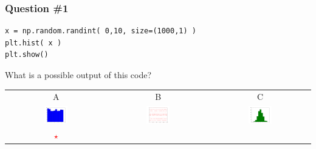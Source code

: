\documentclass[11pt]{beamer}
\newcommand{\correctstar}{\textcolor{red}{$\star$}}
\begin{document}
\begin{frame}[fragile]
  \frametitle{Question \#1}
  \Enlarge

  \begin{Verbatim}
x = np.random.randint( 0,10, size=(1000,1) )
plt.hist( x )
plt.show()
  \end{Verbatim}

  What is a possible output of this code?

  \begin{center}
  \begin{tabular}{ccc}
    A & B & C \\
    \includegraphics[width=0.25\textwidth]{./img/figure_1.png}
    &
    \includegraphics[width=0.25\textwidth]{./img/figure_2.png}
    &
    \includegraphics[width=0.25\textwidth]{./img/figure_3.png}
    \\
    \correctstar & & \\
  \end{tabular}
  \end{center}
\end{frame}
\end{document}
